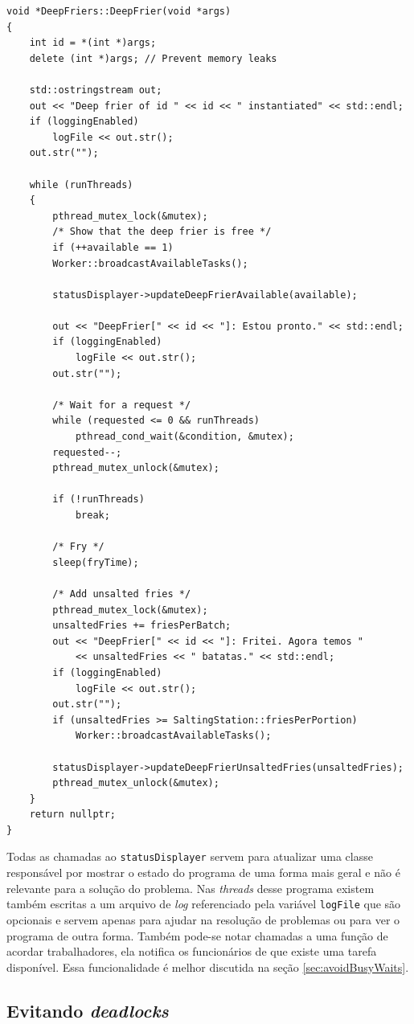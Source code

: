 \documentclass[a4paper]{article}
\begin{document}
\begin{lstlisting}[caption=\textit{Threads} das fritadeiras.\label{lst:deepFriersThread}]
void *DeepFriers::DeepFrier(void *args)
{
	int id = *(int *)args;
	delete (int *)args; // Prevent memory leaks
	
	std::ostringstream out;
	out << "Deep frier of id " << id << " instantiated" << std::endl;
	if (loggingEnabled)
		logFile << out.str();
	out.str("");
	
	while (runThreads)
	{
		pthread_mutex_lock(&mutex);
		/* Show that the deep frier is free */
		if (++available == 1)
		Worker::broadcastAvailableTasks();
		
		statusDisplayer->updateDeepFrierAvailable(available);
		
		out << "DeepFrier[" << id << "]: Estou pronto." << std::endl;
		if (loggingEnabled)
			logFile << out.str();
		out.str("");
		
		/* Wait for a request */
		while (requested <= 0 && runThreads)
			pthread_cond_wait(&condition, &mutex);
		requested--;
		pthread_mutex_unlock(&mutex);
		
		if (!runThreads)
			break;
		
		/* Fry */
		sleep(fryTime);
		
		/* Add unsalted fries */
		pthread_mutex_lock(&mutex);
		unsaltedFries += friesPerBatch;
		out << "DeepFrier[" << id << "]: Fritei. Agora temos " 
			<< unsaltedFries << " batatas." << std::endl;
		if (loggingEnabled)
			logFile << out.str();
		out.str("");
		if (unsaltedFries >= SaltingStation::friesPerPortion)
			Worker::broadcastAvailableTasks();
		
		statusDisplayer->updateDeepFrierUnsaltedFries(unsaltedFries);
		pthread_mutex_unlock(&mutex);
	}
	return nullptr;
}
\end{lstlisting}

Todas as chamadas ao \texttt{statusDisplayer} servem para atualizar uma classe responsável por mostrar o estado do programa de uma forma mais geral e não é relevante para a solução do problema. Nas \textit{threads} desse programa existem também escritas a um arquivo de \textit{log} referenciado pela variável \texttt{logFile} que são opcionais e servem apenas para ajudar na resolução de problemas ou para ver o programa de outra forma. Também pode-se notar chamadas a uma função de acordar trabalhadores, ela notifica os funcionários de que existe uma tarefa disponível. Essa funcionalidade é melhor discutida na seção \ref{sec:avoidBusyWaits}.

\subsection{Evitando \textit{deadlocks}}
\label{sec:avoidDeadlocks}
\end{document}
